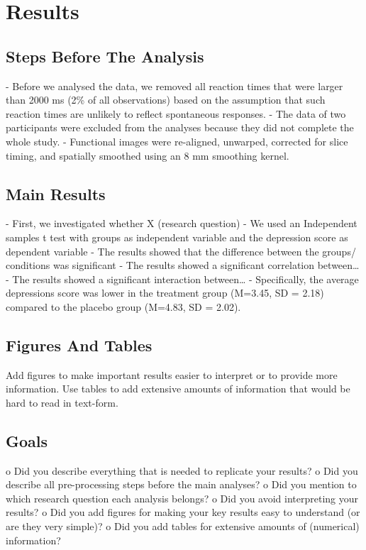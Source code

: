 \chapter{Results}

\section{Steps Before The Analysis}
\label{steps-before-analysis}

- Before we analysed the data, we removed all reaction times that were larger than 2000 ms
(2\% of all observations) based on the assumption that such reaction times are unlikely to
reflect spontaneous responses.
- The data of two participants were excluded from the analyses because they did not complete
the whole study.
- Functional images were re-aligned, unwarped, corrected for slice timing, and spatially
smoothed using an 8 mm smoothing kernel.

\section{Main Results}
\label{main-results}

- First, we investigated whether X (research question)
- We used an Independent samples t test with groups as independent variable and the
depression score as dependent variable
- The results showed that the difference between the groups/ conditions was significant
- The results showed a significant correlation between…
- The results showed a significant interaction between…
- Specifically, the average depressions score was lower in the treatment group (M=3.45, SD = 2.18) compared to the placebo group (M=4.83, SD = 2.02).

\section{Figures And Tables}
\label{figures-and-tables}

Add figures to make important results easier to interpret or to provide more information. Use tables to add extensive amounts of information that would be hard to read in text-form.

\section{Goals}
\label{chapter3-goals}

o Did you describe everything that is needed to replicate your results?
o Did you describe all pre-processing steps before the main analyses?
o Did you mention to which research question each analysis belongs?
o Did you avoid interpreting your results?
o Did you add figures for making your key results easy to understand (or are they very simple)?
o Did you add tables for extensive amounts of (numerical) information?
